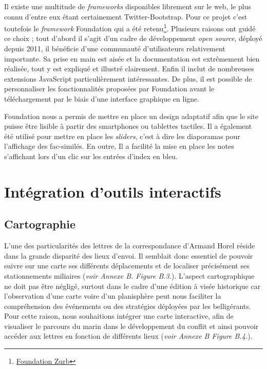 \documentclass[12pt,a4paper]{book} %
\begin{document}
Il existe une multitude de \textit{frameworks} disponibles librement sur le web, le plus connu d'entre eux étant certainement Twitter-Bootstrap. Pour ce projet c'est toutefois le \textit{framework} Foundation qui a été retenu\footnote{\href{http://foundation.zurb.com}{Foundation Zurb}}. Plusieurs raisons ont guidé ce choix ; tout d'abord il s'agit d'un cadre de développement \textit{open source}, déployé depuis 2011, il bénéficie d'une communauté d'utilisateurs relativement importante. Sa prise en main est aisée et la documentation est extrêmement bien réalisée, tout y est expliqué et illustré clairement. Enfin il inclut de nombreuses extensions JavaScript particulièrement intéressantes. De plus, il est possible de personnaliser les fonctionnalités proposées par Foundation avant le téléchargement par le biais d'une interface graphique en ligne.

Foundation nous a permis de mettre en place un design adaptatif afin que le site puisse être lisible à partir des smartphones ou tablettes tactiles. Il a également été utilisé pour mettre en place les \textit{sliders}, c'est à dire les diaporamas pour l'affichage des fac-similés. En outre, Il a facilité la mise en place les notes  s'affichant lors d'un clic sur les entrées d'index en bleu. 

\chapter{Intégration d'outils interactifs}

\section{Cartographie}
L'une des particularités des lettres de la correspondance d'Armand Horel réside dans la grande disparité des lieux d'envoi. Il semblait donc essentiel de pouvoir suivre sur une carte ses différents déplacements et de localiser précisément  ses stationnements miliaires (\textit{voir Annexe B. Figure B.3.}). L'aspect cartographique ne doit pas être négligé, surtout dans le cadre d'une édition à visée historique car l'observation d'une carte voire d'un planisphère peut nous faciliter la compréhension des événements ou des stratégies déployées par les belligérants. Pour cette raison, nous souhaitions intégrer une carte interactive, afin de visualiser le parcours du marin dans le développement du conflit et ainsi pouvoir accéder aux lettres en fonction de différents lieux (\textit{voir Annexe B Figure B.4.}).
\end{document}
